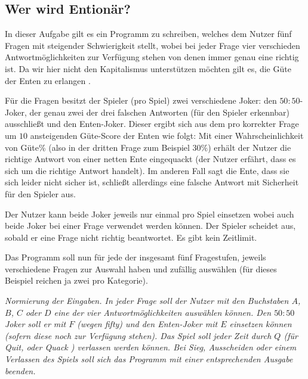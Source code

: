 \documentclass[table]{sopra-base}
\begin{document}

\subsection{Wer wird Entionär?}

In dieser Aufgabe gilt es ein Programm zu schreiben, welches dem Nutzer fünf Fragen mit steigender Schwierigkeit stellt, wobei bei jeder Frage vier verschieden Antwortmöglichkeiten zur Verfügung stehen
von denen immer genau eine richtig ist. Da wir hier nicht den Kapitalismus unterstützen möchten gilt es, die Güte der Enten zu erlangen \Tongey.\par{}
Für die Fragen besitzt der Spieler (pro Spiel) zwei verschiedene Joker: den $50:50$-Joker, der genau zwei der drei falschen Antworten (für den Spieler erkennbar) ausschließt und den Enten-Joker. Dieser ergibt sich aus dem pro korrekter Frage um $10$ ansteigenden Güte-Score der Enten wie folgt: Mit einer Wahrscheinlichkeit von Güte\% (also in der dritten Frage zum Beispiel $30\%$) erhält der Nutzer die richtige Antwort von einer netten Ente eingequackt (der Nutzer erfährt, dass es sich um die richtige Antwort handelt). Im anderen Fall sagt die Ente, dass sie sich leider nicht sicher ist, schließt allerdings eine falsche Antwort mit Sicherheit für den Spieler aus. \par{}
Der Nutzer kann beide Joker jeweils nur einmal pro Spiel einsetzen wobei auch beide Joker bei einer Frage
verwendet werden können. Der Spieler scheidet aus, sobald er eine Frage nicht richtig beantwortet. Es gibt kein Zeitlimit.\par{}

Das Programm soll nun für jede der insgesamt fünf Fragestufen, jeweils verschiedene Fragen zur Auswahl haben und zufällig auswählen (für dieses Beispiel reichen ja zwei pro Kategorie).\par{}

\textit{Normierung der Eingaben. In jeder Frage soll der Nutzer mit den Buchstaben $A$, $B$, $C$ oder $D$ eine der vier Antwortmöglichkeiten auswählen können. Den $50:50$ Joker soll er mit $F$ (wegen fifty) und den Enten-Joker mit $E$ einsetzen können (sofern diese noch zur Verfügung stehen). Das Spiel soll jeder Zeit durch $Q$ (für Quit, oder Quack \Tongey) verlassen werden können. Bei Sieg, Ausscheiden oder einem Verlassen des Spiels soll sich das Programm mit einer entsprechenden Ausgabe beenden.}
\end{document}
